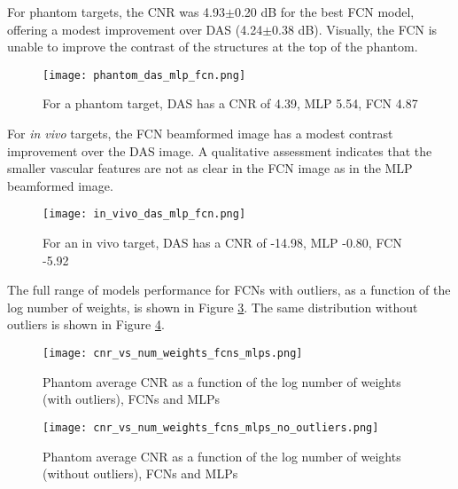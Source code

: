   For phantom targets, the CNR was 4.93$\pm$0.20 dB for the best FCN model, offering a modest improvement over DAS (4.24$\pm$0.38 dB). Visually, the FCN is unable to improve the contrast of the structures at the top of the phantom.

  \begin{figure}[htbp]
    \centerline{\texttt{[image: phantom\_das\_mlp\_fcn.png]}}
    \caption{For a phantom target, DAS has a CNR of 4.39, MLP 5.54, FCN 4.87}
    \label{fig}
  \end{figure}

  For \textit{in vivo} targets, the FCN beamformed image has a modest contrast improvement over the DAS image. A qualitative assessment indicates that the smaller vascular features are not as clear in the FCN image as in the MLP beamformed image.


  \begin{figure}[htbp]
    \centerline{\texttt{[image: in\_vivo\_das\_mlp\_fcn.png]}}
    \caption{For an in vivo target, DAS has a CNR of -14.98, MLP -0.80, FCN -5.92}
    \label{fig}
  \end{figure}

  The full range of models performance for FCNs with outliers, as a function of the log number of weights, is shown in Figure \ref{fig:cnr_vs_num_weights_fcns_mlps}. The same distribution without outliers is shown in Figure \ref{fig:cnr_vs_num_weights_fcns_mlps_no_outliers}.

  \begin{figure}[htbp]
    \centerline{\texttt{[image: cnr\_vs\_num\_weights\_fcns\_mlps.png]}}
    \caption{Phantom average CNR as a function of the log number of weights (with outliers), FCNs and MLPs}
    \label{fig:cnr_vs_num_weights_fcns_mlps}
  \end{figure}

  \begin{figure}[htbp]
    \centerline{\texttt{[image: cnr\_vs\_num\_weights\_fcns\_mlps\_no\_outliers.png]}}
    \caption{Phantom average CNR as a function of the log number of weights (without outliers), FCNs and MLPs}
    \label{fig:cnr_vs_num_weights_fcns_mlps_no_outliers}
  \end{figure}

